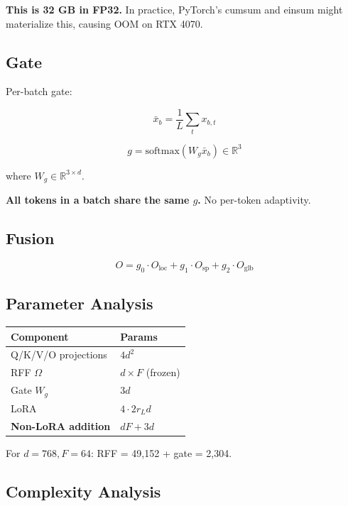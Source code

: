 \textbf{This is 32 GB in FP32.} In practice, PyTorch's cumsum and einsum might 
materialize this, causing OOM on RTX 4070.

\subsection{Gate}

Per-batch gate:

\[
\bar{x}_b = \frac{1}{L} \sum_t x_{b,t}
\tag{4.13}
\]

\[
g = \text{softmax}(W_g \bar{x}_b) \in \mathbb{R}^3
\tag{4.14}
\]

where $W_g \in \mathbb{R}^{3 \times d}$.

\textbf{All tokens in a batch share the same $g$.} No per-token adaptivity.

\subsection{Fusion}

\[
O = g_0 \cdot O_{\text{loc}} + g_1 \cdot O_{\text{sp}} + g_2 \cdot O_{\text{glb}}
\tag{4.15}
\]

\subsection{Parameter Analysis}

\begin{table}[H]
\centering
\small
\begin{tabular}{ll}
\toprule
\textbf{Component} & \textbf{Params} \\
\midrule
Q/K/V/O projections & $4 d^2$ \\
RFF $\Omega$ & $d \times F$ (frozen) \\
Gate $W_g$ & $3 d$ \\
LoRA & $4 \cdot 2 r_L d$ \\
\textbf{Non-LoRA addition} & $d F + 3d$ \\
\bottomrule
\end{tabular}
\end{table}

For $d = 768, F = 64$: RFF = 49,152 + gate = 2,304.

\subsection{Complexity Analysis}

